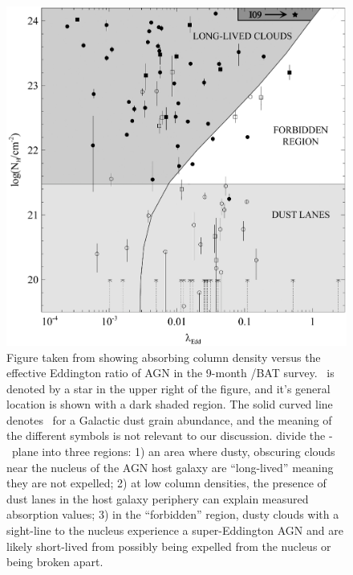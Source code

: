 \begin{figure}
  \begin{center}
    \begin{minipage}{0.5\linewidth}
      \includegraphics*[width=\textwidth]{f09.eps}
    \end{minipage}
    \caption{Figure taken from \citet{2009MNRAS.394L..89F} showing
      absorbing column density versus the effective Eddington ratio of
      AGN in the 9-month \swift/BAT survey. \irs\ is denoted by a star
      in the upper right of the figure, and it's general location is
      shown with a dark shaded region. The solid curved line denotes
      \leff\ for a Galactic dust grain abundance, and the meaning of
      the different symbols is not relevant to our
      discussion. \citet{2009MNRAS.394L..89F} divide the
      \leff-\nhabs\ plane into three regions: 1) an area where dusty,
      obscuring clouds near the nucleus of the AGN host galaxy are
      ``long-lived'' meaning they are not expelled; 2) at low column
      densities, the presence of dust lanes in the host galaxy
      periphery can explain measured absorption values; 3) in the
      ``forbidden'' region, dusty clouds with a sight-line to the
      nucleus experience a super-Eddington AGN and are likely
      short-lived from possibly being expelled from the nucleus or
      being broken apart.}
    \label{fig:f09}
  \end{center}
\end{figure}
